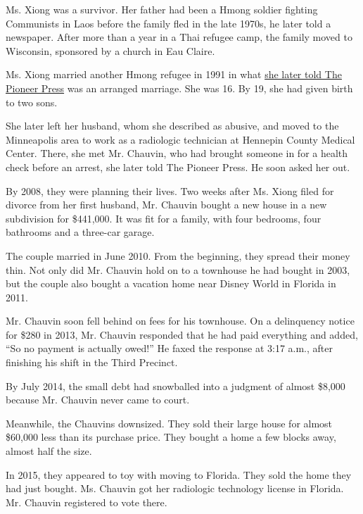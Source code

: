 Ms. Xiong was a survivor. Her father had been a Hmong soldier fighting
Communists in Laos before the family fled in the late 1970s, he later
told a newspaper. After more than a year in a Thai refugee camp, the
family moved to Wisconsin, sponsored by a church in Eau Claire.

Ms. Xiong married another Hmong refugee in 1991 in what
\href{https://www.twincities.com/2019/01/06/first-hmong-mrs-minnesota-america-readies-for-the-national-pageant-stage/https://www.twincities.com/2018/06/02/refugee-who-was-shamed-for-her-looks-as-a-child-is-vying-to-be-the-first-hmong-mrs-minnesota/}{she
later told The Pioneer Press} was an arranged marriage. She was 16. By
19, she had given birth to two sons.

She later left her husband, whom she described as abusive, and moved to
the Minneapolis area to work as a radiologic technician at Hennepin
County Medical Center. There, she met Mr. Chauvin, who had brought
someone in for a health check before an arrest, she later told The
Pioneer Press. He soon asked her out.

By 2008, they were planning their lives. Two weeks after Ms. Xiong filed
for divorce from her first husband, Mr. Chauvin bought a new house in a
new subdivision for \$441,000. It was fit for a family, with four
bedrooms, four bathrooms and a three-car garage.

The couple married in June 2010. From the beginning, they spread their
money thin. Not only did Mr. Chauvin hold on to a townhouse he had
bought in 2003, but the couple also bought a vacation home near Disney
World in Florida in 2011.

Mr. Chauvin soon fell behind on fees for his townhouse. On a delinquency
notice for \$280 in 2013, Mr. Chauvin responded that he had paid
everything and added, ``So no payment is actually owed!'' He faxed the
response at 3:17 a.m., after finishing his shift in the Third Precinct.

By July 2014, the small debt had snowballed into a judgment of almost
\$8,000 because Mr. Chauvin never came to court.

Meanwhile, the Chauvins downsized. They sold their large house for
almost \$60,000 less than its purchase price. They bought a home a few
blocks away, almost half the size.

In 2015, they appeared to toy with moving to Florida. They sold the home
they had just bought. Ms. Chauvin got her radiologic technology license
in Florida. Mr. Chauvin registered to vote there.

